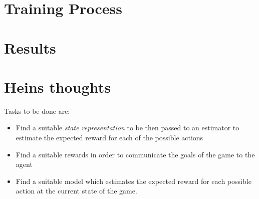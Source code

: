 \documentclass[12pt]{report}
\begin{document}
\section{Training Process}


\section{Results}



\section{Heins thoughts}
Tasks to be done are:
	\begin{itemize}
		\item Find a suitable \textit{state representation} to be then passed to an estimator to estimate the expected reward for each of the possible actions
		\item Find a suitable rewards in order to communicate the goals of the game to the agent
		\item Find a suitable model which estimates the expected reward for each possible action at the current state of the game.
	\end{itemize}
\end{document}
